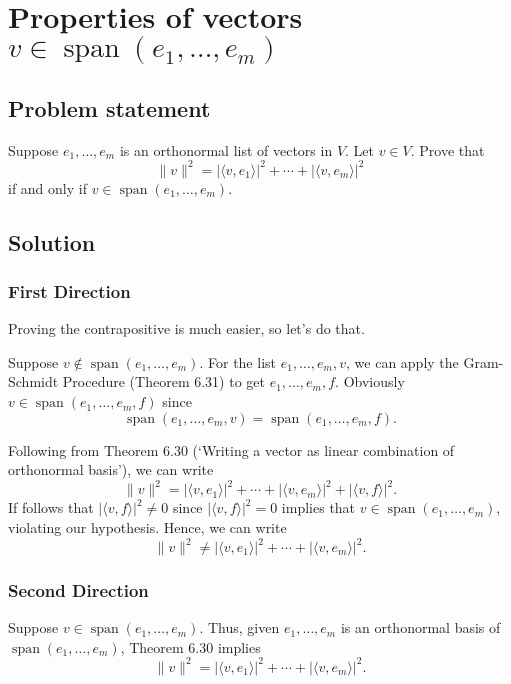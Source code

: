 \documentclass{article}
\providecommand{\abs}[1]{\lvert#1\rvert} \providecommand{\norm}[1]{\lVert#1\rVert}
\begin{document}
\clearpage

\section{Properties of vectors $v\in\operatorname{span}(e_1,\ldots,e_m)$}
\subsection*{Problem statement}
Suppose $e_1,\ldots,e_m$ is an orthonormal list of vectors in $V$. 
Let $v\in V$. 
Prove that
\[\norm{v}^2=\abs{\langle v,e_1\rangle}^2+\cdots+\abs{\langle v,e_m\rangle}^2\]
if and only if $v\in\operatorname{span}(e_1,\ldots,e_m)$.

\subsection*{Solution}
\subsubsection*{First Direction}
Proving the contrapositive is much easier, so let's do that. 

Suppose $v\notin\operatorname{span}(e_1,\ldots,e_m)$. 
For the list $e_1,\ldots,e_m,v$, we can apply the Gram-Schmidt Procedure (Theorem 6.31) to get $e_1,\ldots,e_m,f$. 
Obviously \newline$v\in\operatorname{span}(e_1,\ldots,e_m,f)$ since 
\[\operatorname{span}(e_1,\ldots,e_m,v)=\operatorname{span}(e_1,\ldots,e_m,f).\]

Following from Theorem 6.30 (`Writing a vector as linear combination of orthonormal basis'), we can write
\[\norm{v}^2=\abs{\langle v,e_1\rangle}^2+\cdots+\abs{\langle v,e_m\rangle}^2+\abs{\langle v,f\rangle}^2.\]
If follows that $\abs{\langle v,f\rangle}^2\neq0$ since $\abs{\langle v,f\rangle}^2=0$ implies that $v\in\operatorname{span}(e_1,\ldots,e_m)$, violating our hypothesis. 
Hence, we can write
\[\norm{v}^2\neq \abs{\langle v,e_1\rangle}^2+\cdots+\abs{\langle v,e_m\rangle}^2.\]

\subsubsection*{Second Direction}
Suppose $v\in\operatorname{span}(e_1,\ldots,e_m)$. 
Thus, given $e_1,\ldots,e_m$ is an orthonormal basis of $\operatorname{span}(e_1,\ldots,e_m)$, Theorem 6.30 implies
\[\norm{v}^2 = \abs{\langle v,e_1\rangle}^2+\cdots+\abs{\langle v,e_m\rangle}^2.\]
\end{document}
